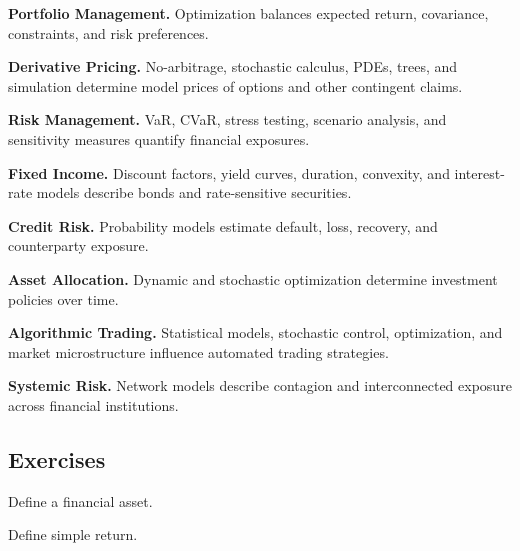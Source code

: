 \begin{applicationbox}

\textbf{Portfolio Management.}
Optimization balances expected return, covariance, constraints, and risk
preferences.

\medskip

\textbf{Derivative Pricing.}
No-arbitrage, stochastic calculus, PDEs, trees, and simulation determine
model prices of options and other contingent claims.

\medskip

\textbf{Risk Management.}
VaR, CVaR, stress testing, scenario analysis, and sensitivity measures
quantify financial exposures.

\medskip

\textbf{Fixed Income.}
Discount factors, yield curves, duration, convexity, and interest-rate models
describe bonds and rate-sensitive securities.

\medskip

\textbf{Credit Risk.}
Probability models estimate default, loss, recovery, and counterparty
exposure.

\medskip

\textbf{Asset Allocation.}
Dynamic and stochastic optimization determine investment policies over time.

\medskip

\textbf{Algorithmic Trading.}
Statistical models, stochastic control, optimization, and market
microstructure influence automated trading strategies.

\medskip

\textbf{Systemic Risk.}
Network models describe contagion and interconnected exposure across
financial institutions.

\end{applicationbox}

\subsection{Exercises}
\label{subsec:mathematical-finance-exercises}

\begin{exercise}[1]
Define a financial asset.
\end{exercise}

\begin{exercise}[1]
Define simple return.
\end{exercise}

